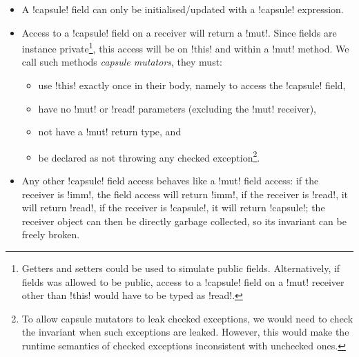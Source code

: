\SSI\begin{itemize}
	\item A \Q!capsule! field can only be initialised/updated with a \Q!capsule! expression.
	\item Access to a \Q!capsule! field on a \Q@mut@ receiver will return a \Q!mut!. Since fields are instance private\footnote{Getters and setters could be used to simulate public fields. Alternatively, if fields was allowed to be public, access to a \Q!capsule! field on a \Q!mut! receiver other than \Q!this! would have to be typed as \Q!read!.}, this access will be on \Q!this! and within a \Q!mut! method. We call such methods \emph{capsule mutators}, they must:
\begin{itemize}
		\item use \Q!this! exactly once in their body, namely to access the \Q!capsule! field,
		\item have no \Q!mut! or \Q!read! parameters (excluding the \Q!mut! receiver),
		\item not have a \Q!mut! return type, and
		\item be declared as not throwing any checked exception\footnote{To allow capsule mutators to leak checked exceptions, we would need to check the invariant when such exceptions are leaked. However, this would make the runtime semantics of checked exceptions inconsistent with unchecked ones.}.
	\end{itemize}	
	\item Any other \Q!capsule! field access behaves like a \Q!mut! field access: if the receiver is \Q!imm!, the field access will return \Q!imm!, if the receiver is \Q!read!, it will return \Q!read!, if the receiver is \Q!capsule!, it will return \Q!capsule!;
the receiver object can then be directly garbage collected, so its invariant can be freely broken. %
	
\end{itemize}

